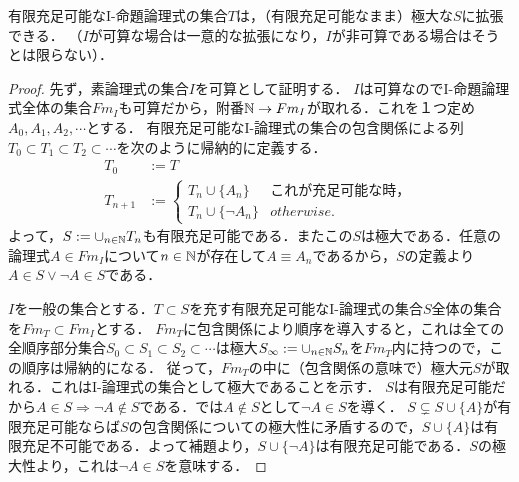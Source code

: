 \documentclass[uplatex, 12pt, dvipdfmx]{jsreport}
\begin{document}
\begin{proposition}[命題論理のコンパクト性定理２]\label{prop-compactness-of-propositional-logic-2}
    有限充足可能なI-命題論理式の集合$T$は，（有限充足可能なまま）極大な$S$に拡張できる．
    （$I$が可算な場合は一意的な拡張になり，$I$が非可算である場合はそうとは限らない）．
\end{proposition}
\begin{proof}
    先ず，素論理式の集合$I$を可算として証明する．
    $I$は可算なのでI-命題論理式全体の集合$Fm_I$も可算だから，附番$\mathbb{N}\to Fm_I$が取れる．これを１つ定め$A_0,A_1,A_2,\cdots$とする．
    有限充足可能なI-論理式の集合の包含関係による列$T_0\subset T_1\subset T_2\subset \cdots$を次のように帰納的に定義する．
    \begin{align*}
        T_0&:=T\\
        T_{n+1}&:=\begin{cases}
            T_n\cup\{A_n\} & これが充足可能な時，\\
            T_n\cup\{\lnot A_n\} &otherwise.
        \end{cases}
    \end{align*}
    よって，$S:=\cup_{n\in\mathbb{N}}T_n$も有限充足可能である．またこの$S$は極大である．任意の論理式$A\in Fm_I$について$n\in\mathbb{N}$が存在して$A\equiv A_n$であるから，$S$の定義より$A\in S\lor \lnot A\in S$である．

    $I$を一般の集合とする．$T\subset S$を充す有限充足可能なI-論理式の集合$S$全体の集合を$Fm_T\subset Fm_I$とする．
    $Fm_T$に包含関係により順序を導入すると，これは全ての全順序部分集合$S_0\subset S_1\subset S_2\subset\cdots$は極大$S_\infty:=\cup_{n\in\mathbb{N}}S_n$を$Fm_T$内に持つので，この順序は帰納的になる．
    従って，$Fm_T$の中に（包含関係の意味で）極大元$S$が取れる．これはI-論理式の集合として極大であることを示す．
    $S$は有限充足可能だから$A\in S\Rightarrow \lnot A\notin S$である．では$A\notin S$として$\lnot A\in S$を導く．
    $S\subsetneq S\cup\{A\}$が有限充足可能ならば$S$の包含関係についての極大性に矛盾するので，$S\cup\{A\}$は有限充足不可能である．よって補題より，$S\cup\{\lnot A\}$は有限充足可能である．$S$の極大性より，これは$\lnot A\in S$を意味する．
\end{proof}
\end{document}
